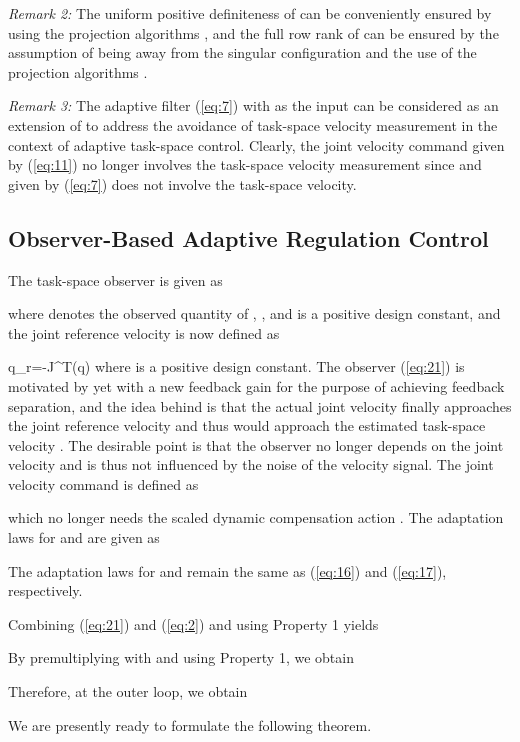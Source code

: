\documentclass[9pt,technote]{IEEEtran}
\def \be {}
\begin{document}
\emph{Remark 2:} The uniform positive definiteness of  can be conveniently ensured by using the projection algorithms \cite{Ioannou1996_Book}, and the full row rank of  can be ensured by the assumption of being away from the singular configuration and the use of the projection algorithms \cite{Cheah2006_IJRR,Dixon2007_TAC}.

\emph{Remark 3: } The adaptive filter (\ref{eq:7}) with  as the input can be considered as an extension of \cite{Berghuis1993_SCL} to address the avoidance of task-space velocity measurement in the context of adaptive task-space control. Clearly, the joint velocity command given by (\ref{eq:11}) no longer involves the task-space velocity measurement since  and  given by (\ref{eq:7}) does not involve the task-space velocity.

\subsection{Observer-Based Adaptive Regulation Control}

The task-space observer is given as

where  denotes the observed quantity of , , and  is a positive design constant, and the joint reference velocity  is now defined as
\be
\label{eq:22}
\dot q_r=-\hat J^{T}(q)
\ee
where  is a positive design constant. {The observer (\ref{eq:21}) is motivated by \cite{Wang2015_CCC} yet with a new feedback gain  for the purpose of achieving feedback separation, and the idea behind is that the actual joint velocity finally approaches the joint reference velocity  and thus  would approach the estimated task-space velocity . The desirable point is that the observer no longer depends on the joint velocity and is thus not influenced by the noise of the velocity signal.} The joint velocity command is defined as
 
 which no longer needs the scaled dynamic compensation action . The adaptation laws for  and  are given as
 
 The adaptation laws for  and  remain the same as (\ref{eq:16}) and (\ref{eq:17}), respectively.

Combining (\ref{eq:21}) and (\ref{eq:2}) and using Property 1 yields

By premultiplying  with  and using Property 1, we obtain

Therefore, at the outer loop, we obtain


We are presently ready to formulate the following theorem.
\end{document}
